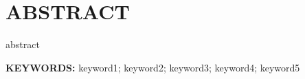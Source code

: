 \chapter*{\bf {} ABSTRACT}
\thispagestyle{frontstyle}
\markboth{}{}

{

abstract



\vspace{0.8cm}
\noindent\textbf{KEYWORDS: }keyword1; keyword2; keyword3; keyword4; keyword5

}